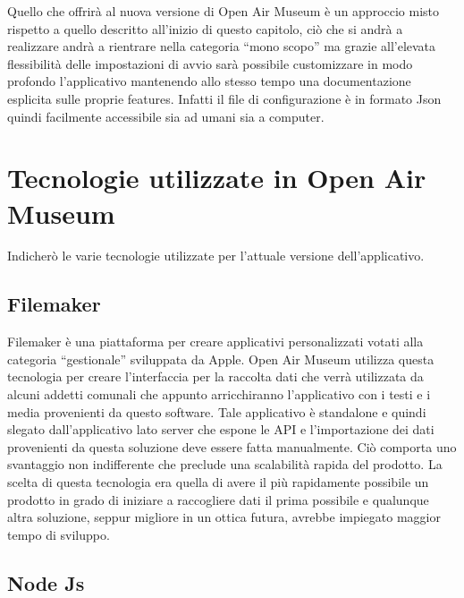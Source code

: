 Quello che offrirà al nuova versione di Open Air Museum è un approccio misto rispetto a quello descritto all’inizio di questo capitolo, ciò che si andrà a realizzare andrà a rientrare nella categoria “mono scopo” ma grazie all’elevata flessibilità delle impostazioni di avvio sarà possibile customizzare in modo profondo l’applicativo mantenendo allo stesso tempo una documentazione esplicita sulle proprie features. Infatti il file di configurazione è in formato Json\cite{JSON} quindi facilmente accessibile sia ad umani sia a computer.\vspace{5mm}

\section{Tecnologie utilizzate in Open Air Museum}\vspace{5mm}

Indicherò le varie tecnologie utilizzate per l'attuale versione dell'applicativo.\vspace{5mm}

\subsection{Filemaker}\vspace{5mm}

Filemaker è una piattaforma per creare applicativi personalizzati votati alla categoria “gestionale” sviluppata da Apple. Open Air Museum utilizza questa tecnologia per creare l’interfaccia per la raccolta dati che verrà utilizzata da alcuni addetti comunali che appunto arricchiranno l’applicativo con i testi e i media provenienti da questo software. Tale applicativo è standalone e quindi slegato dall’applicativo lato server che espone le API e l’importazione dei dati provenienti da questa soluzione deve essere fatta manualmente. Ciò comporta uno svantaggio non indifferente che preclude una scalabilità rapida del prodotto. La scelta di questa tecnologia era quella di avere il più rapidamente possibile un prodotto in grado di iniziare a raccogliere dati il prima possibile e qualunque altra soluzione, seppur migliore in un ottica futura, avrebbe impiegato maggior tempo di sviluppo.\vspace{5mm}

\subsection{Node Js}\vspace{5mm}

